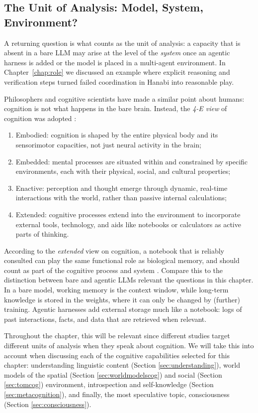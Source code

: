 \subsection{The Unit of Analysis: Model, System, Environment?} \label{sec:unit}
A returning question is what counts as the unit of analysis: a capacity that is absent in a bare LLM may arise at the level of the \emph{system} once an agentic harness is added or the model is placed in a multi-agent environment. In Chapter~\ref{chap:role} we discussed an example where  explicit reasoning and verification steps turned failed coordination in Hanabi into reasonable play. 

Philosophers and cognitive scientists have made a similar point about humans: cognition is not what happens in the bare brain. Instead, the \emph{4-E view} of cognition was adopted \citep{noe2009outofourheads, Carney2020foure}: 
\begin{enumerate}
    \item Embodied: cognition is shaped by the entire physical body and its sensorimotor capacities, not just neural activity in the brain;
    \item Embedded: mental processes are situated within and constrained by specific environments, each with their physical, social, and cultural properties;
    \item Enactive: perception and thought emerge through dynamic, real-time interactions with the world, rather than passive internal calculations;
    \item Extended: cognitive processes extend into the environment to incorporate external tools, technology, and aids like notebooks or calculators as active parts of thinking. 
\end{enumerate}

According to the \emph{extended} view on cognition, a notebook that is reliably consulted can play the same functional role as biological memory, and should count as part of the cognitive process and system \citep{clark1998extended}. Compare this to the distinction between bare and agentic LLMs relevant the questions in this chapter. In a bare model, working memory is the context window, while long-term knowledge is stored in the weights, where it can only be changed by (further) training. Agentic harnesses add external storage much like a notebook: logs of past interactions, facts, and data that are retrieved when relevant. 

Throughout the chapter, this will be relevant since different studies target different units of analysis when they speak about cognition. We will take this into account when discussing each of the cognitive capabilities selected for this chapter: understanding linguistic content (Section \ref{sec:understanding}), world models of the spatial (Section \ref{sec:worldmodelscog}) and social (Section \ref{sec:tomcog}) environment, introspection and self-knowledge (Section \ref{sec:metacognition}), and finally, the most speculative topic, consciousness (Section \ref{sec:consciousness}).

